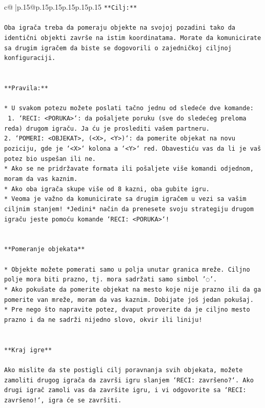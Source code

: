 \documentclass{article}
\begin{document}
{\begin{supertabular}{c@{$\;$}|p{.15\linewidth}@{}p{.15\linewidth}p{.15\linewidth}p{.15\linewidth}p{.15\linewidth}p{.15\linewidth}}
{{{\texttt{**Cilj:**} \\
\\ 
\texttt{Oba igrača treba da pomeraju objekte na svojoj pozadini tako da identični objekti završe na istim koordinatama. Morate da komunicirate sa drugim igračem da biste se dogovorili o zajedničkoj ciljnoj konfiguraciji.} \\
\\ 
\\ 
\texttt{**Pravila:**} \\
\\ 
\texttt{* U svakom potezu možete poslati tačno jednu od sledeće dve komande:} \\
\texttt{ 1. `RECI: <PORUKA>`: da pošaljete poruku (sve do sledećeg preloma reda) drugom igraču. Ja ću je proslediti vašem partneru.} \\
\texttt{2. `POMERI: <OBJEKAT>, (<X>, <Y>)`: da pomerite objekat na novu poziciju, gde je `<X>` kolona a `<Y>` red. Obavestiću vas da li je vaš potez bio uspešan ili ne.} \\
\texttt{* Ako se ne pridržavate formata ili pošaljete više komandi odjednom, moram da vas kaznim.} \\
\texttt{* Ako oba igrača skupe više od 8 kazni, oba gubite igru.} \\
\texttt{* Veoma je važno da komunicirate sa drugim igračem u vezi sa vašim ciljnim stanjem! *Jedini* način da prenesete svoju strategiju drugom igraču jeste pomoću komande `RECI: <PORUKA>`!} \\
\\ 
\\ 
\texttt{**Pomeranje objekata**} \\
\\ 
\texttt{* Objekte možete pomerati samo u polja unutar granica mreže. Ciljno polje mora biti prazno, tj. mora sadržati samo simbol '◌'.} \\
\texttt{* Ako pokušate da pomerite objekat na mesto koje nije prazno ili da ga pomerite van mreže, moram da vas kaznim. Dobijate još jedan pokušaj.} \\
\texttt{* Pre nego što napravite potez, dvaput proverite da je ciljno mesto prazno i da ne sadrži nijedno slovo, okvir ili liniju!} \\
\\ 
\\ 
\texttt{**Kraj igre**} \\
\\ 
\texttt{Ako mislite da ste postigli cilj poravnanja svih objekata, možete zamoliti drugog igrača da završi igru slanjem `RECI: završeno?`. Ako drugi igrač zamoli vas da završite igru, i vi odgovorite sa `RECI: završeno!`, igra će se završiti.} \\
}}}
\end{supertabular}}
\end{document}

